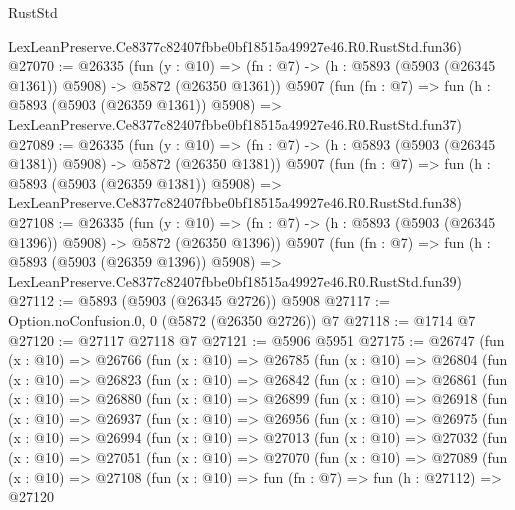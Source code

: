 \begin{lexlean}{RustStd}
\begin{coremodule}
    LexLeanPreserve.Ce8377c82407fbbe0bf18515a49927e46.R0.RustStd.fun36)
@27070 := @26335
    (fun (y : @10) => (fn : @7) -> (h : @5893 (@5903 (@26345 @1361)) @5908) -> @5872 (@26350 @1361))
    @5907
    (fun (fn : @7) =>
    fun (h : @5893 (@5903 (@26359 @1361)) @5908) =>
    LexLeanPreserve.Ce8377c82407fbbe0bf18515a49927e46.R0.RustStd.fun37)
@27089 := @26335
    (fun (y : @10) => (fn : @7) -> (h : @5893 (@5903 (@26345 @1381)) @5908) -> @5872 (@26350 @1381))
    @5907
    (fun (fn : @7) =>
    fun (h : @5893 (@5903 (@26359 @1381)) @5908) =>
    LexLeanPreserve.Ce8377c82407fbbe0bf18515a49927e46.R0.RustStd.fun38)
@27108 := @26335
    (fun (y : @10) => (fn : @7) -> (h : @5893 (@5903 (@26345 @1396)) @5908) -> @5872 (@26350 @1396))
    @5907
    (fun (fn : @7) =>
    fun (h : @5893 (@5903 (@26359 @1396)) @5908) =>
    LexLeanPreserve.Ce8377c82407fbbe0bf18515a49927e46.R0.RustStd.fun39)
@27112 := @5893 (@5903 (@26345 @2726)) @5908
@27117 := Option.noConfusion.{0, 0} (@5872 (@26350 @2726)) @7
@27118 := @1714 @7
@27120 := @27117 @27118 @7
@27121 := @5906 @5951
@27175 := @26747
    (fun (x : @10) =>
    @26766
      (fun (x : @10) =>
      @26785
        (fun (x : @10) =>
        @26804
          (fun (x : @10) =>
          @26823
            (fun (x : @10) =>
            @26842
              (fun (x : @10) =>
              @26861
                (fun (x : @10) =>
                @26880
                  (fun (x : @10) =>
                  @26899
                    (fun (x : @10) =>
                    @26918
                      (fun (x : @10) =>
                      @26937
                        (fun (x : @10) =>
                        @26956
                          (fun (x : @10) =>
                          @26975
                            (fun (x : @10) =>
                            @26994
                              (fun (x : @10) =>
                              @27013
                                (fun (x : @10) =>
                                @27032
                                  (fun (x : @10) =>
                                  @27051
                                    (fun (x : @10) =>
                                    @27070
                                      (fun (x : @10) =>
                                      @27089
                                        (fun (x : @10) =>
                                        @27108
                                          (fun (x : @10) =>
                                          fun (fn : @7) =>
                                          fun (h : @27112) =>
                                          @27120

\end{coremodule}
\end{lexlean}
